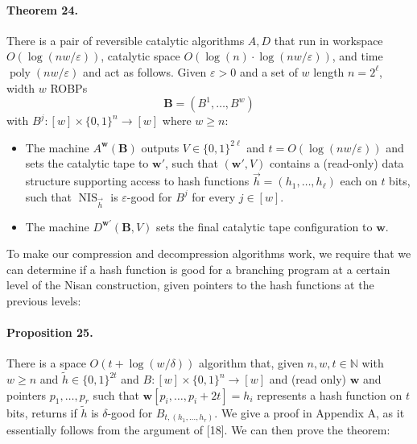 \paragraph{Theorem 24.} There is a pair of reversible catalytic algorithms $A,D$ that run in workspace $O(\log(nw/\varepsilon))$, catalytic space $O(\log(n)\cdot\log(nw/\varepsilon))$, and time $\operatorname{poly}(nw/\varepsilon)$ and act as follows. Given $\varepsilon>0$ and a set of $w$ length $n=2^\ell$, width $w$ ROBPs
\[\mathbf B=(B^1,\ldots,B^w)\]
with $B^j:[w]\times\{0,1\}^n\to[w]$ where $w\geq n$:
\begin{itemize}
\item The machine $A^{\mathbf w}(\mathbf B)$ outputs $V\in\{0,1\}^{2\ell}$ and $t=O(\log(nw/\varepsilon))$ and sets the catalytic tape to $\mathbf w'$, such that $(\mathbf w',V)$ contains a (read-only) data structure supporting access to hash functions $\vec h=(h_1,\ldots,h_\ell)$ each on $t$ bits, such that $\operatorname{NIS}_{\vec h}$ is $\varepsilon$-good for $B^j$ for every $j\in[w]$.
\item The machine $D^{\mathbf w'}(\mathbf B,V)$ sets the final catalytic tape configuration to $\mathbf w$.
\end{itemize}
To make our compression and decompression algorithms work, we require that we can determine if a hash function is good for a branching program at a certain level of the Nisan construction, given pointers to the hash functions at the previous levels:
\paragraph{Proposition 25.} There is a space $O(t+\log(w/\delta))$ algorithm that, given $n,w,t\in\mathbb N$ with $w\geq n$ and $\widetilde h\in\{0,1\}^{2t}$ and $B:[w]\times\{0,1\}^n\to[w]$ and (read only) $\mathbf w$ and pointers $p_1,\ldots,p_r$ such that $\mathbf w[p_i,\ldots,p_i+2t]=h_i$ represents a hash function on $t$ bits, returns if $\widetilde h$ is $\delta$-good for $B_{t,(h_1,\ldots,h_r)}$.
We give a proof in Appendix A, as it essentially follows from the argument of [18]. We can then prove the theorem:
